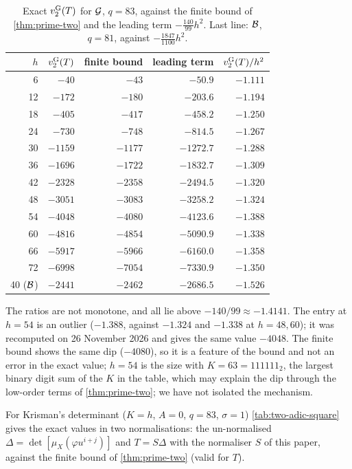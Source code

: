 \begin{table}[ht]
\centering
\caption{Exact $v_{2}^{\mathrm{G}}(T)$ for $\mathcal{G}$, $q=83$, against the finite bound of \cref{thm:prime-two}
and the leading term $-\frac{140}{99}h^2$. Last line: $\mathcal{B}$, $q=81$, against
$-\frac{1847}{1100}h^2$.}\label{tab:two-adic}
\begin{tabular}{@{}rrrrr@{}}
\toprule
$h$ & $v_{2}^{\mathrm{G}}(T)$ & finite bound & leading term & $v_{2}^{\mathrm{G}}(T)/h^2$\\
\midrule
6 & $-40$ & $-43$ & $-50.9$ & $-1.111$\\
12 & $-172$ & $-180$ & $-203.6$ & $-1.194$\\
18 & $-405$ & $-417$ & $-458.2$ & $-1.250$\\
24 & $-730$ & $-748$ & $-814.5$ & $-1.267$\\
30 & $-1159$ & $-1177$ & $-1272.7$ & $-1.288$\\
36 & $-1696$ & $-1722$ & $-1832.7$ & $-1.309$\\
42 & $-2328$ & $-2358$ & $-2494.5$ & $-1.320$\\
48 & $-3051$ & $-3083$ & $-3258.2$ & $-1.324$\\
54 & $-4048$ & $-4080$ & $-4123.6$ & $-1.388$\\
60 & $-4816$ & $-4854$ & $-5090.9$ & $-1.338$\\
66 & $-5917$ & $-5966$ & $-6160.0$ & $-1.358$\\
72 & $-6998$ & $-7054$ & $-7330.9$ & $-1.350$\\
\midrule
40 ($\mathcal{B}$) & $-2441$ & $-2462$ & $-2686.5$ & $-1.526$\\
\bottomrule
\end{tabular}
\end{table}

The ratios are not monotone, and all lie above $-140/99\approx-1.4141$. The entry at $h=54$ is an
outlier ($-1.388$, against $-1.324$ and $-1.338$ at $h=48,60$); it was recomputed on
26 November 2026 and gives the same value $-4048$. The finite bound shows the same dip
($-4080$), so it is a feature of the bound and not an error in the exact value; $h=54$ is the
size with $K=63=111111_2$, the largest binary digit sum of the $K$ in the table, which may explain the dip
through the low-order terms of \cref{thm:prime-two}; we have not isolated the mechanism.

For Krisman's determinant ($K=h$, $A=0$, $q=83$, $\sigma=1$) \cref{tab:two-adic-square} gives the
exact values in two normalisations: the un-normalised $\Delta=\det[\mu_X(\varphi u^{i+j})]$ and
$T=S\Delta$ with the normaliser $S$ of this paper, against the finite bound of
\cref{thm:prime-two} (valid for $T$).

